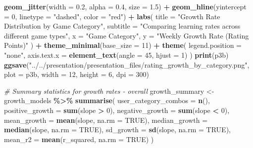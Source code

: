 \documentclass[
]{article}
\newenvironment{Shaded}{\begin{snugshade}}{\end{snugshade}}
\newcommand{\AttributeTok}[1]{\textcolor[rgb]{0.13,0.29,0.53}{#1}}
\newcommand{\CommentTok}[1]{\textcolor[rgb]{0.56,0.35,0.01}{\textit{#1}}}
\newcommand{\ConstantTok}[1]{\textcolor[rgb]{0.56,0.35,0.01}{#1}}
\newcommand{\DecValTok}[1]{\textcolor[rgb]{0.00,0.00,0.81}{#1}}
\newcommand{\FloatTok}[1]{\textcolor[rgb]{0.00,0.00,0.81}{#1}}
\newcommand{\FunctionTok}[1]{\textcolor[rgb]{0.13,0.29,0.53}{\textbf{#1}}}
\newcommand{\NormalTok}[1]{#1}
\newcommand{\OtherTok}[1]{\textcolor[rgb]{0.56,0.35,0.01}{#1}}
\newcommand{\SpecialCharTok}[1]{\textcolor[rgb]{0.81,0.36,0.00}{\textbf{#1}}}
\newcommand{\StringTok}[1]{\textcolor[rgb]{0.31,0.60,0.02}{#1}}
\begin{document}
\begin{Shaded}
\begin{Highlighting}[]
        \FunctionTok{geom\_jitter}\NormalTok{(}\AttributeTok{width =} \FloatTok{0.2}\NormalTok{, }\AttributeTok{alpha =} \FloatTok{0.4}\NormalTok{, }\AttributeTok{size =} \FloatTok{1.5}\NormalTok{) }\SpecialCharTok{+}
        \FunctionTok{geom\_hline}\NormalTok{(}\AttributeTok{yintercept =} \DecValTok{0}\NormalTok{, }\AttributeTok{linetype =} \StringTok{"dashed"}\NormalTok{, }\AttributeTok{color =} \StringTok{"red"}\NormalTok{) }\SpecialCharTok{+}
        \FunctionTok{labs}\NormalTok{(}
            \AttributeTok{title =} \StringTok{"Growth Rate Distribution by Game Category"}\NormalTok{,}
            \AttributeTok{subtitle =} \StringTok{"Comparing learning rates across different game types"}\NormalTok{,}
            \AttributeTok{x =} \StringTok{"Game Category"}\NormalTok{,}
            \AttributeTok{y =} \StringTok{"Weekly Growth Rate (Rating Points)"}
\NormalTok{        ) }\SpecialCharTok{+}
        \FunctionTok{theme\_minimal}\NormalTok{(}\AttributeTok{base\_size =} \DecValTok{11}\NormalTok{) }\SpecialCharTok{+}
        \FunctionTok{theme}\NormalTok{(}
            \AttributeTok{legend.position =} \StringTok{"none"}\NormalTok{,}
            \AttributeTok{axis.text.x =} \FunctionTok{element\_text}\NormalTok{(}\AttributeTok{angle =} \DecValTok{45}\NormalTok{, }\AttributeTok{hjust =} \DecValTok{1}\NormalTok{)}
\NormalTok{        )}
    \FunctionTok{print}\NormalTok{(p3b)}
    \FunctionTok{ggsave}\NormalTok{(}\StringTok{"../../presentation/presentation\_files/rating\_growth\_by\_category.png"}\NormalTok{, }\AttributeTok{plot =}\NormalTok{ p3b, }\AttributeTok{width =} \DecValTok{12}\NormalTok{, }\AttributeTok{height =} \DecValTok{6}\NormalTok{, }\AttributeTok{dpi =} \DecValTok{300}\NormalTok{)}

    \CommentTok{\# Summary statistics for growth rates {-} overall}
\NormalTok{    growth\_summary }\OtherTok{\textless{}{-}}\NormalTok{ growth\_models }\SpecialCharTok{\%\textgreater{}\%}
        \FunctionTok{summarise}\NormalTok{(}
            \AttributeTok{user\_category\_combos =} \FunctionTok{n}\NormalTok{(),}
            \AttributeTok{positive\_growth =} \FunctionTok{sum}\NormalTok{(slope }\SpecialCharTok{\textgreater{}} \DecValTok{0}\NormalTok{),}
            \AttributeTok{negative\_growth =} \FunctionTok{sum}\NormalTok{(slope }\SpecialCharTok{\textless{}} \DecValTok{0}\NormalTok{),}
            \AttributeTok{mean\_growth =} \FunctionTok{mean}\NormalTok{(slope, }\AttributeTok{na.rm =} \ConstantTok{TRUE}\NormalTok{),}
            \AttributeTok{median\_growth =} \FunctionTok{median}\NormalTok{(slope, }\AttributeTok{na.rm =} \ConstantTok{TRUE}\NormalTok{),}
            \AttributeTok{sd\_growth =} \FunctionTok{sd}\NormalTok{(slope, }\AttributeTok{na.rm =} \ConstantTok{TRUE}\NormalTok{),}
            \AttributeTok{mean\_r2 =} \FunctionTok{mean}\NormalTok{(r\_squared, }\AttributeTok{na.rm =} \ConstantTok{TRUE}\NormalTok{)}
\NormalTok{        )}


\end{Highlighting}
\end{Shaded}
\end{document}
